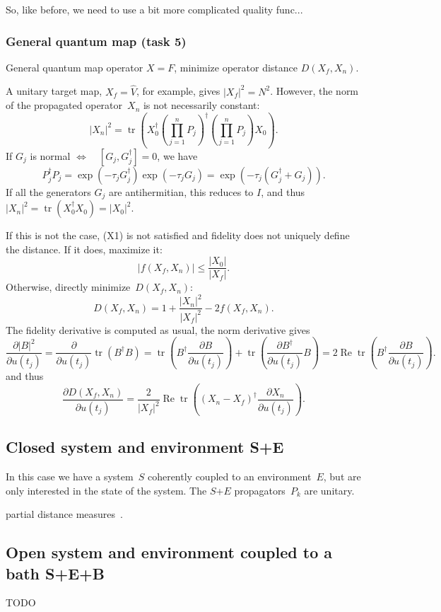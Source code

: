 \documentclass[aps, pra, a4paper, longbibliography]{revtex4}
\newcommand{\I}{I}
\newcommand{\be}{\begin{equation}}
\newcommand{\ee}{\end{equation}}
\newcommand{\eq}{\Leftrightarrow}
\DeclareMathOperator{\tr}{tr}
\DeclareMathOperator{\re}{Re}
\newcommand{\dd}[2]{\frac{\partial #1}{\partial #2}}
\begin{document}
So, like before, we need to use a bit more complicated quality func...



\subsubsection{General quantum map (task 5)}

General quantum map operator $X = F$,
minimize operator distance $D(X_f, X_n)$.

A unitary target map,
$X_f = \hat{V}$, for example, gives $|X_f|^2 = N^2$.
However, the norm of the propagated operator~$X_n$ is not necessarily constant:
\be
|X_n|^2 = \tr\left(X_0^\dagger \left(\prod_{j=1}^{n} P_j\right)^\dagger \left(\prod_{j=1}^{n} P_j\right) X_0\right).
\ee
If $G_j$ is normal $\eq \quad [G_j, G^\dagger_j] = 0$, we have
\be
P_j^\dagger P_j
= \exp(-\tau_j G^\dagger_j) \exp(-\tau_j G_j)
= \exp(-\tau_j (G_j^\dagger + G_j)).
\ee
If all the generators $G_j$ are antihermitian, this reduces to $\I$, and thus
$|X_n|^2 = \tr(X_0^\dagger X_0) = |X_0|^2$.

If this is not the case, (X1) is not satisfied and fidelity does not uniquely define the distance.
If it does, maximize it:
\be
|f(X_f, X_n)| \le \frac{|X_0|}{|X_f|}.
\ee
Otherwise, directly minimize~$D(X_f, X_n)$:
\be
D(X_f, X_n) = 1 +\frac{|X_n|^2}{|X_f|^2} -2 f(X_f, X_n).
\ee
The fidelity derivative is computed as usual, the norm derivative gives
\be
\dd{|B|^2}{u(t_j)}
= \dd{}{u(t_j)} \tr(B^\dagger B)
= \tr\left(B^\dagger \dd{B}{u(t_j)}\right)
+\tr\left(\dd{B^\dagger}{u(t_j)} B \right)
= 2 \re \tr\left(B^\dagger \dd{B}{u(t_j)}\right).
\ee
and thus
\be
\dd{D(X_f, X_n)}{u(t_j)}
= \frac{2}{|X_f|^2} \re \tr\left((X_n-X_f)^\dagger \dd{X_n}{u(t_j)}\right).
\ee


\subsection{Closed system and environment S+E}

In this case we have a system~$S$ coherently coupled to an
environment~$E$, but are only interested in the state of the system.
The $S$+$E$ propagators~$P_k$ are unitary.

partial distance measures~\cite{kosut_2006}.

\subsection{Open system and environment coupled to a bath S+E+B}

TODO




\end{document}
